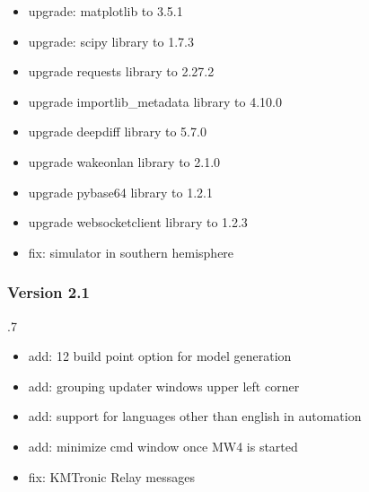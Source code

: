 \documentclass[a4paper,10pt,english]{sphinxmanual}
\begin{document}
\begin{itemize}
\item {} 
\sphinxAtStartPar
upgrade: matplotlib to 3.5.1

\item {} 
\sphinxAtStartPar
upgrade: scipy library to 1.7.3

\item {} 
\sphinxAtStartPar
upgrade requests library to 2.27.2

\item {} 
\sphinxAtStartPar
upgrade importlib\_metadata library to 4.10.0

\item {} 
\sphinxAtStartPar
upgrade deepdiff library to 5.7.0

\item {} 
\sphinxAtStartPar
upgrade wakeonlan library to 2.1.0

\item {} 
\sphinxAtStartPar
upgrade pybase64 library to 1.2.1

\item {} 
\sphinxAtStartPar
upgrade websocket\sphinxhyphen{}client library to 1.2.3

\item {} 
\sphinxAtStartPar
fix: simulator in southern hemisphere

\end{itemize}


\subsubsection{Version 2.1}
\label{\detokenize{changelog/changelog:version-2-1}}
.7
\begin{itemize}
\item {} 
\sphinxAtStartPar
add: 12 build point option for model generation

\item {} 
\sphinxAtStartPar
add: grouping updater windows upper left corner

\item {} 
\sphinxAtStartPar
add: support for languages other than english in automation

\item {} 
\sphinxAtStartPar
add: minimize cmd window once MW4 is started

\item {} 
\sphinxAtStartPar
fix: KMTronic Relay messages

\end{itemize}
\end{document}
